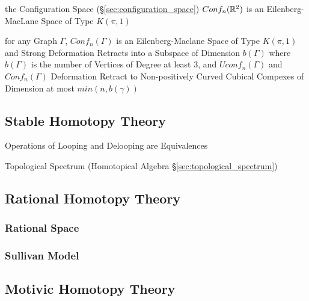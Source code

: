 the Configuration Space (\S\ref{sec:configuration_space}) $Conf_n(\mathbb{R}^2)$
is an Eilenberg-MacLane Space of Type $K(\pi,1)$

for any Graph $\Gamma$, $Conf_n(\Gamma)$ is an Eilenberg-Maclane Space of Type
$K(\pi,1)$ and Strong Deformation Retracts into a Subspace of Dimension
$b(\Gamma)$ where $b(\Gamma)$ is the number of Vertices of Degree at least 3,
and $Uconf_n(\Gamma)$ and $Conf_n(\Gamma)$ Deformation Retract to
Non-positively Curved Cubical Compexes of Dimension at most $min(n,b(\gamma))$



\subsection{Stable Homotopy Theory}\label{sec:stable_homotopy}

Operations of Looping and Delooping are Equivalences

Topological Spectrum (Homotopical Algebra \S\ref{sec:topological_spectrum})



\subsection{Rational Homotopy Theory}\label{sec:rational_homotopy}

\subsubsection{Rational Space}\label{sec:rational_space}

\subsubsection{Sullivan Model}\label{sec:sullivan_model}



\subsection{Motivic Homotopy Theory}\label{sec:motivic_homotopy}

